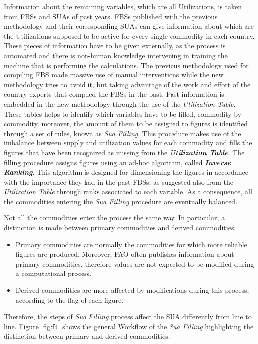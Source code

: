 \documentclass[]{article}
\providecommand{\tightlist}{%
  \setlength{\itemsep}{0pt}\setlength{\parskip}{0pt}}
\begin{document}
Information about the remaining variables, which are all Utilizations,
is taken from FBSs and SUAs of past years. FBSs published with the
previous methodology and their corresponding SUAs can give information
about which are the Utilizations supposed to be active for every single
commodity in each country.\\
These pieces of information have to be given externally, as the process
is automated and there is non-human knowledge intervening in training
the machine that is performing the calculations. The previous
methodology used for compiling FBS made massive use of manual
interventions while the new methodology tries to avoid it, but taking
advantage of the work and effort of the country experts that compiled
the FBSs in the past. Past information is embedded in the new
methodology through the use of the \emph{Utilization Table}. These
tables helps to identify which variables have to be filled, commodity by
commodity. moreover, the amount of them to be assigned to figures is
identified through a set of rules, known as \emph{Sua Filling}. This
procedure makes use of the imbalance between supply and utilization
values for each commodity and fills the figures that have been
recognized as missing from the \textbf{\emph{Utilization Table}}. The
filling procedure assigns figures using an ad-hoc algorithm, called
\textbf{\emph{Inverse Ranking}}. This algorithm is designed for
dimensioning the figures in accordance with the importance they had in
the past FBSs, as suggested also from the \emph{Utilization Table}
through ranks associated to each variable. As a consequence, all the
commodities entering the \emph{Sua Filling} procedure are eventually
balanced.

Not all the commodities enter the process the same way. In particular, a
distinction is made between primary commodities and derived commodities:

\begin{itemize}
\tightlist
\item
  Primary commodities are normally the commodities for which more
  reliable figures are produced. Moreover, FAO often publishes
  information about primary commodities, therefore values are not
  expected to be modified during a computational process.
\item
  Derived commodities are more affected by modifications during this
  process, according to the flag of each figure.
\end{itemize}

Therefore, the steps of \emph{Sua Filling} process affect the SUA
differently from line to line. Figure \ref{fig:f4} shows the general
Workflow of the \emph{Sua Filling} highlighting the distinction between
primary and derived commodities.
\end{document}
